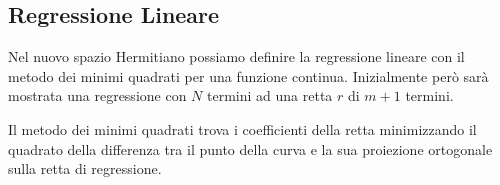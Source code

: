 % 

\subsection{Regressione Lineare}
Nel nuovo spazio Hermitiano possiamo definire la regressione lineare con il
metodo dei minimi quadrati per una funzione continua. Inizialmente per\`o
sar\`a mostrata una regressione con \(N\) termini ad una retta \(r\) di \(m
+1\) termini.

Il metodo dei minimi quadrati trova i coefficienti della retta minimizzando il
quadrato della differenza tra il punto della curva e la sua proiezione
ortogonale sulla retta di regressione.

